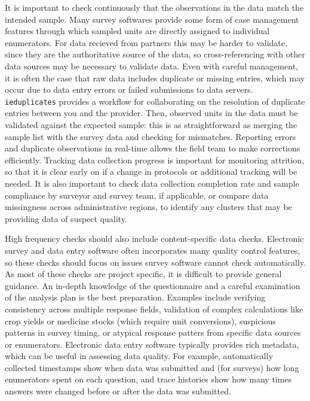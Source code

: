 It is important to check continuously that the observations in the data match the intended sample.
Many survey softwares provide some form of case management features
through which sampled units are directly assigned to individual enumerators.
For data recieved from partners this may be harder to validate,
since they are the authoritative source of the data,
so cross-referencing with other data sources may be necessary to validate data.
Even with careful management, it is often the case that raw data includes duplicate or missing entries,
which may occur due to data entry errors or failed submissions to data servers.
\texttt{ieduplicates}
provides a workflow for collaborating on the resolution of duplicate entries between you and the provider.
Then, observed units in the data must be validated against the expected sample:
this is as straightforward as merging the sample list with the survey data and checking for mismatches.
Reporting errors and duplicate observations in real-time allows the field team to make corrections efficiently.
Tracking data collection progress is important for monitoring attrition,
so that it is clear early on if a change in protocols or additional tracking will be needed.
It is also important to check data collection completion rate
and sample compliance by surveyor and survey team, if applicable,
or compare data missingness across administrative regions,
to identify any clusters that may be providing data of suspect quality.

High frequency checks should also include content-specific data checks.
Electronic survey and data entry software often incorporates many quality control features,
so these checks should focus on issues survey software cannot check automatically.
As most of these checks are project specific,
it is difficult to provide general guidance.
An in-depth knowledge of the questionnaire and a careful examination of the analysis plan
is the best preparation.
Examples include verifying consistency across multiple response fields,
validation of complex calculations like crop yields or medicine stocks (which require unit conversions),
suspicious patterns in survey timing,
or atypical response patters from specific data sources or enumerators.
Electronic data entry software typically provides rich metadata,
which can be useful in assessing data quality.
For example, automatically collected timestamps show when data was submitted
and (for surveys) how long enumerators spent on each question,
and trace histories show how many
times answers were changed before or after the data was submitted.

